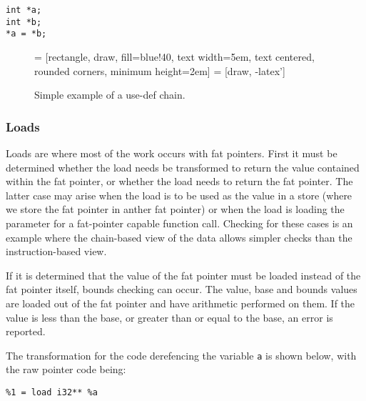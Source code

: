\begin{verbatim}
int *a;
int *b;
*a = *b;
\end{verbatim}
\begin{figure}
 = [rectangle, draw, fill=blue!40, 
    text width=5em, text centered, rounded corners, minimum height=2em]
 = [draw, -latex']
\caption{Simple example of a use-def chain.}
\label{fig:UseDef}
\end{figure}

\subsubsection{Loads}

Loads are where most of the work occurs with fat pointers.
First it must be determined whether the load needs be transformed to return the value contained within the fat pointer, or whether the load needs to return the fat pointer.
The latter case may arise when the load is to be used as the value in a store (where we store the fat pointer in anther fat pointer) or when the load is loading the parameter for a fat-pointer capable function call.
Checking for these cases is an example where the chain-based view of the data allows simpler checks than the instruction-based view.

If it is determined that the value of the fat pointer must be loaded instead of the fat pointer itself, bounds checking can occur.
The value, base and bounds values are loaded out of the fat pointer and have arithmetic performed on them.
If the value is less than the base, or greater than or equal to the base, an error is reported.

The transformation for the code derefencing the variable \verb!a! is shown below, with the raw pointer code being:

\begin{verbatim}
%1 = load i32** %a
\end{verbatim}

